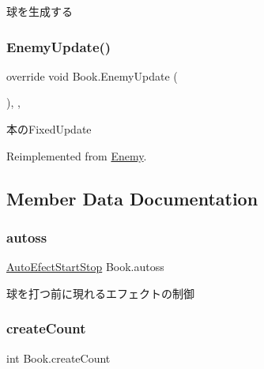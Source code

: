 球を生成する 

\mbox{\label{class_book_ad838b454ccd9f8c4e88215aa220226a4}} 
\subsubsection{\texorpdfstring{Enemy\+Update()}{EnemyUpdate()}}
{\footnotesize\ttfamily override void Book.\+Enemy\+Update (\begin{DoxyParamCaption}{ }\end{DoxyParamCaption})\hspace{0.3cm}{\ttfamily [inline]}, {\ttfamily [protected]}, {\ttfamily [virtual]}}



本の\+Fixed\+Update 



Reimplemented from \hyperlink{class_enemy_ab19a73003a5b443ba93f4b6a45c0abad}{Enemy}.



\subsection{Member Data Documentation}
\mbox{\label{class_book_a11aaae4569af0471e6b5f67d4523bcf2}} 
\subsubsection{\texorpdfstring{autoss}{autoss}}
{\footnotesize\ttfamily \hyperlink{class_auto_efect_start_stop}{Auto\+Efect\+Start\+Stop} Book.\+autoss\hspace{0.3cm}{\ttfamily [private]}}



球を打つ前に現れるエフェクトの制御 

\mbox{\label{class_book_af625fb16f0bc669f6ccc9547d8577ee8}} 
\subsubsection{\texorpdfstring{create\+Count}{createCount}}
{\footnotesize\ttfamily int Book.\+create\+Count\hspace{0.3cm}{\ttfamily [private]}}



